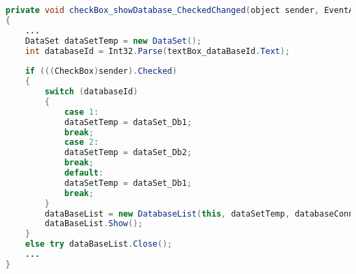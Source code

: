 \label{lst:showDb}
\begin{lstlisting}[language=Java, caption=Datenbank anzeigen]
private void checkBox_showDatabase_CheckedChanged(object sender, EventArgs e)
{
	...
	DataSet dataSetTemp = new DataSet();
	int databaseId = Int32.Parse(textBox_dataBaseId.Text);
	
	if (((CheckBox)sender).Checked)
	{
		switch (databaseId)
		{
			case 1:
			dataSetTemp = dataSet_Db1;
			break;
			case 2:
			dataSetTemp = dataSet_Db2;
			break;
			default:
			dataSetTemp = dataSet_Db1;
			break;
		}
		dataBaseList = new DatabaseList(this, dataSetTemp, databaseConnection, databaseId);
		dataBaseList.Show();
	}
	else try dataBaseList.Close();
	...
}
\end{lstlisting}